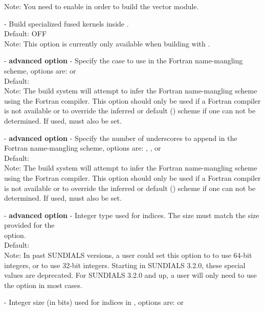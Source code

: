 \begin{description}
  Note: You need to enable {\cuda} in order to build the {\raja} vector module.
\item[\id{SUNDIALS\_BUILD\_PACKAGE\_FUSED\_KERNELS}] -
  Build specialized fused kernels inside {\cvode}.
  \\
  Default: OFF
  \\
  Note: This option is currently only available when building with
  .
\item[\id{SUNDIALS\_F77\_FUNC\_CASE}] - \textbf{advanced option} -
  Specify the case to use in the Fortran name-mangling scheme, options
  are:  or 
  \\
  Default:
  \\
  Note: The build system will attempt to infer the Fortran
  name-mangling scheme using the Fortran compiler. This option should
  only be used if a Fortran compiler is not available or to override
  the inferred or default () scheme if one can not be
  determined. If used,  must also
  be set.
\item[\id{SUNDIALS\_F77\_FUNC\_UNDERSCORES}] - \textbf{advanced option} -
  Specify the number of underscores to append in the Fortran
  name-mangling scheme, options are: , , or 
  \\
  Default:
  \\
  Note: The build system will attempt to infer the Fortran
  name-mangling scheme using the Fortran compiler. This option should
  only be used if a Fortran compiler is not available or to override
  the inferred or default () scheme if one can not be
  determined. If used,  must also be set.
\item[\id{SUNDIALS\_INDEX\_TYPE}] - \textbf{advanced option} -
  Integer type used for {\sundials} indices. The size must match the size provided for
  the \\ \noindent {} option.
  \\
  Default:
  \\
  Note:
  In past SUNDIALS versions, a user could set this option to  to use 64-bit
  integers, or  to use 32-bit integers. Starting in SUNDIALS 3.2.0, these
  special values are deprecated. For SUNDIALS 3.2.0 and up, a user will only need to use
  the  option in most cases.
\item[\id{SUNDIALS\_INDEX\_SIZE}] -
  Integer size (in bits) used for indices in {\sundials}, options are:  or 

\end{description}
